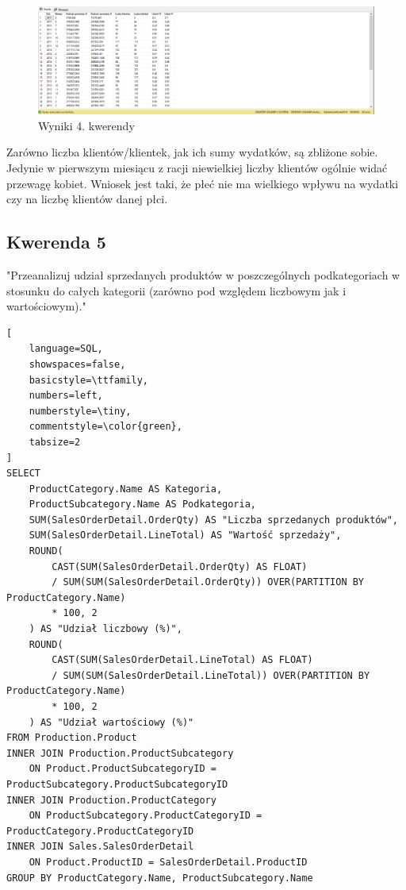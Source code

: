 \documentclass[a4paper,12pt]{article}
\begin{document}
\begin{figure}[H]
	\centering
	\includegraphics[width=1.0\textwidth]{images/4.png}
	\caption{Wyniki 4. kwerendy}
\end{figure}

Zarówno liczba klientów/klientek, jak ich sumy wydatków, są zbliżone sobie. Jedynie w pierwszym miesiącu z racji niewielkiej liczby klientów ogólnie widać przewagę kobiet. Wniosek jest taki, że płeć nie ma wielkiego wpływu na wydatki czy na liczbę klientów danej płci.

\subsection{Kwerenda 5}

"Przeanalizuj udział sprzedanych produktów w poszczególnych podkategoriach w stosunku do całych kategorii (zarówno pod względem liczbowym jak i wartościowym)."

{\small
\begin{lstlisting}[
	language=SQL,
	showspaces=false,
	basicstyle=\ttfamily,
	numbers=left,
	numberstyle=\tiny,
	commentstyle=\color{green},
	tabsize=2
]
SELECT 
	ProductCategory.Name AS Kategoria,
	ProductSubcategory.Name AS Podkategoria,
	SUM(SalesOrderDetail.OrderQty) AS "Liczba sprzedanych produktów",
	SUM(SalesOrderDetail.LineTotal) AS "Wartość sprzedaży",
	ROUND(
		CAST(SUM(SalesOrderDetail.OrderQty) AS FLOAT) 
		/ SUM(SUM(SalesOrderDetail.OrderQty)) OVER(PARTITION BY ProductCategory.Name) 
		* 100, 2
	) AS "Udział liczbowy (%)",
	ROUND(
		CAST(SUM(SalesOrderDetail.LineTotal) AS FLOAT) 
		/ SUM(SUM(SalesOrderDetail.LineTotal)) OVER(PARTITION BY ProductCategory.Name) 
		* 100, 2
	) AS "Udział wartościowy (%)"
FROM Production.Product
INNER JOIN Production.ProductSubcategory 
	ON Product.ProductSubcategoryID = ProductSubcategory.ProductSubcategoryID
INNER JOIN Production.ProductCategory 
	ON ProductSubcategory.ProductCategoryID = ProductCategory.ProductCategoryID
INNER JOIN Sales.SalesOrderDetail 
	ON Product.ProductID = SalesOrderDetail.ProductID
GROUP BY ProductCategory.Name, ProductSubcategory.Name
\end{lstlisting}}
\end{document}
